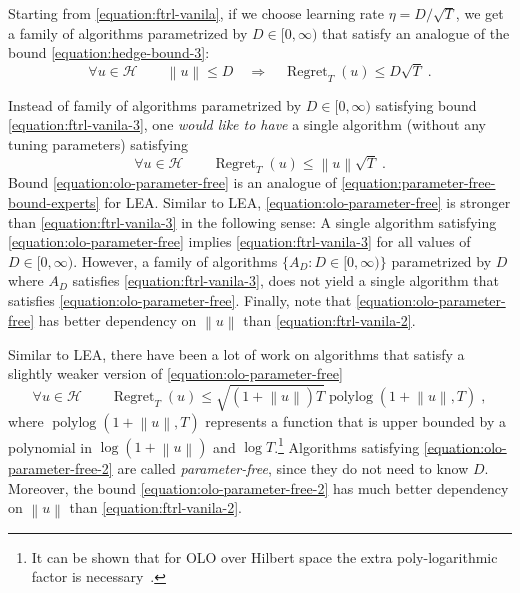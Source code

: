 \documentclass{colt2016} %
\DeclareMathOperator{\Regret}{Regret}
\DeclareMathOperator{\polylog}{polylog}
\renewcommand{\H}{\mathcal{H}}  %
\newcommand{\norm}[1]{\left\|{#1}\right\|}
\begin{document}
Starting from \eqref{equation:ftrl-vanila}, if we choose learning rate $\eta =
D/\sqrt{T}$, we get a family of algorithms parametrized by $D \in [0,\infty)$
that satisfy an analogue of the bound \eqref{equation:hedge-bound-3}:
\begin{equation}
\label{equation:ftrl-vanila-3}
\forall u \in \H \qquad \norm{u} \le D \quad  \Longrightarrow \quad \Regret_T(u) \le D \sqrt{T} \; .
\end{equation}

Instead of family of algorithms parametrized by $D \in [0,\infty)$ satisfying
bound \eqref{equation:ftrl-vanila-3}, one \emph{would like
to have} a single algorithm (without any tuning parameters) satisfying
\begin{equation}
\label{equation:olo-parameter-free}
\forall u \in \H \qquad \Regret_T(u) \le \norm{u} \sqrt{T} \; .
\end{equation}
Bound \eqref{equation:olo-parameter-free} is an analogue of
\eqref{equation:parameter-free-bound-experts} for LEA. Similar to LEA,
\eqref{equation:olo-parameter-free} is stronger than
\eqref{equation:ftrl-vanila-3} in the following sense: A single algorithm
satisfying \eqref{equation:olo-parameter-free} implies
\eqref{equation:ftrl-vanila-3} for all values of $D \in [0,\infty)$.  However,
a family of algorithms $\{A_D : D \in [0,\infty)\}$ parametrized by $D$ where
$A_D$ satisfies \eqref{equation:ftrl-vanila-3}, does not yield a single
algorithm that satisfies \eqref{equation:olo-parameter-free}.  Finally, note
that \eqref{equation:olo-parameter-free} has better dependency on $\norm{u}$
than \eqref{equation:ftrl-vanila-2}.

Similar to LEA, there have been a lot of work on algorithms
\citep{Streeter-McMahan-2012, Orabona-2013, McMahan-Abernethy-2013,
McMahan-Orabona-2014} that satisfy a slightly weaker version of
\eqref{equation:olo-parameter-free}
\begin{equation}
\label{equation:olo-parameter-free-2}
\forall u \in \H \qquad \Regret_T(u) \le \sqrt{(1 + \norm{u}) T} \polylog(1 + \norm{u}, T) \; ,
\end{equation}
where $\polylog(1 + \norm{u}, T)$ represents a function that is upper bounded
by a polynomial in $\log(1+\norm{u})$ and $\log T$.\footnote{It can be shown
that for OLO over Hilbert space the extra poly-logarithmic factor is
necessary~\citep{McMahan-Abernethy-2013,Orabona-2013}.} Algorithms satisfying
\eqref{equation:olo-parameter-free-2} are called \emph{parameter-free}, since
they do not need to know $D$.  Moreover, the bound
\eqref{equation:olo-parameter-free-2} has much better dependency on $\norm{u}$
than \eqref{equation:ftrl-vanila-2}.
\end{document}
